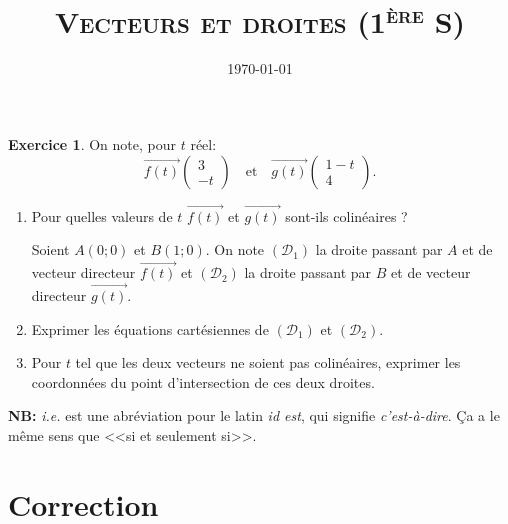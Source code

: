 \documentclass{article}
\title{\textsc{Vecteurs et droites (1\textsuperscript{ère} S)} }
\author{}
\date{\today}
\theoremstyle{definition}
\newtheorem{exo}{Exercice}
\begin{document}
\maketitle

\begin{exo}
	On note, pour $t$ réel:
    \[
    \overrightarrow{f(t)}\begin{pmatrix}
    3 \\ -t
    \end{pmatrix}\quad\text{et}\quad
    \overrightarrow{g(t)}\begin{pmatrix}
    1-t \\ 4
    \end{pmatrix}.\]
	\begin{enumerate}
	\item Pour quelles valeurs de $t$ $\overrightarrow{f(t)}$ et $\overrightarrow{g(t)}$ sont-ils colinéaires ?\par

Soient $A(0;0)$ et $B(1;0)$. On note $(\mathcal{D}_1)$ la droite passant par $A$ et de vecteur directeur $\overrightarrow{f(t)}$ et $(\mathcal{D}_2)$ la droite passant par $B$ et de vecteur directeur $\overrightarrow{g(t)}$.
    \item Exprimer les équations cartésiennes de $(\mathcal{D}_1)$ et $(\mathcal{D}_2)$.
    \item Pour $t$ tel que les deux vecteurs ne soient pas colinéaires, exprimer les coordonnées du point d'intersection de ces deux droites.
	\end{enumerate}
\end{exo}

\textbf{NB:} \textit{i.e.} est une abréviation pour le latin \textit{id est}, qui signifie \textit{c'est-à-dire}. Ça a le même sens que <<si et seulement si>>.

%
%

\section*{Correction}
\end{document}
